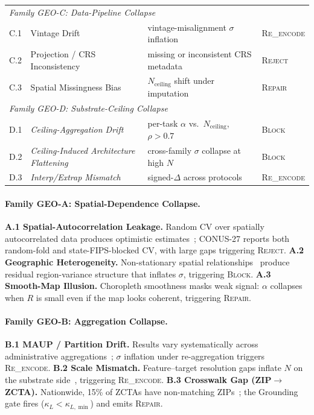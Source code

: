 \documentclass{article}
\begin{document}
\begin{table}[htbp]
\begin{tabular}{llll}
\midrule
\multicolumn{4}{l}{\textit{Family GEO-C: Data-Pipeline Collapse}} \\
C.1 & Vintage Drift                             & vintage-misalignment $\sigma$ inflation                               & \textsc{Re\_encode} \\
C.2 & Projection / CRS Inconsistency            & missing or inconsistent CRS metadata                                  & \textsc{Reject}    \\
C.3 & Spatial Missingness Bias                  & $N_{\text{ceiling}}$ shift under imputation                           & \textsc{Repair}    \\
\midrule
\multicolumn{4}{l}{\textit{Family GEO-D: Substrate-Ceiling Collapse}} \\
D.1 & \textit{Ceiling-Aggregation Drift}        & per-task $\alpha$ vs.\ $N_{\text{ceiling}}$, $\rho > 0.7$            & \textsc{Block}     \\
D.2 & \textit{Ceiling-Induced Architecture Flattening}          & cross-family $\sigma$ collapse at high $N$                            & \textsc{Block}     \\
D.3 & \textit{Interp/Extrap Mismatch}           & signed-$\Delta$ across protocols                                      & \textsc{Re\_encode} \\
\bottomrule
\end{tabular}
\end{table}

\paragraph{Family GEO-A: Spatial-Dependence Collapse.}
\textbf{A.1 Spatial-Autocorrelation Leakage.} Random CV over spatially autocorrelated data produces optimistic estimates~\citep{roberts2017cv,ploton2020spatial,mila2022nndm}; CONUS-27 reports both random-fold and state-FIPS-blocked CV, with large gaps triggering \textsc{Reject}.
\textbf{A.2 Geographic Heterogeneity.} Non-stationary spatial relationships~\citep{brunsdon1996gwr} produce residual region-variance structure that inflates $\sigma$, triggering \textsc{Block}.
\textbf{A.3 Smooth-Map Illusion.} Choropleth smoothness masks weak signal: $\alpha$ collapses when $R$ is small even if the map looks coherent, triggering \textsc{Repair}.

\paragraph{Family GEO-B: Aggregation Collapse.}
\textbf{B.1 MAUP / Partition Drift.} Results vary systematically across administrative aggregations~\citep{openshaw1984maup}; $\sigma$ inflation under re-aggregation triggers \textsc{Re\_encode}.
\textbf{B.2 Scale Mismatch.} Feature--target resolution gaps inflate $N$ on the substrate side~\citep{workman2022resolution}, triggering \textsc{Re\_encode}.
\textbf{B.3 Crosswalk Gap (ZIP$\to$ZCTA).} Nationwide, 15\% of ZCTAs have non-matching ZIPs~\citep{krieger2002zip,chen2025crosswalk}; the Grounding gate fires ($\kappa_L < \kappa_{L,\min}$) and emits \textsc{Repair}.
\end{document}
